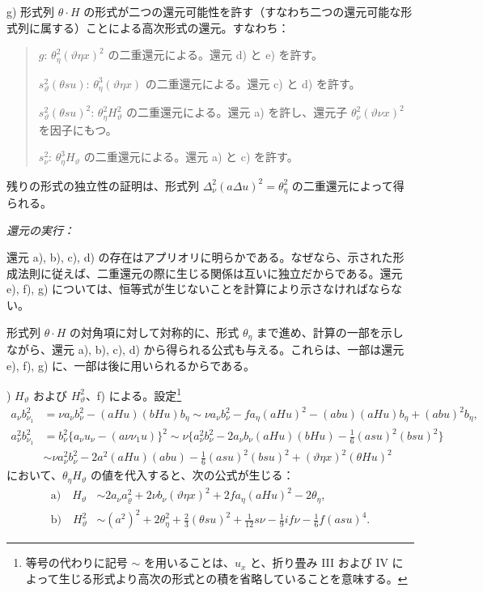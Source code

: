 \documentclass[11pt]{article}
\newcommand{\A}{\Delta}
\newcommand{\R}{\varrho}
\begin{document}
g) 形式列 $\theta\cdot H$ の形式が二つの還元可能性を許す（すなわち二つの還元可能な形式列に属する）ことによる高次形式の還元。すなわち：
\begin{quote}\small
$g$: $\theta_\eta^2(\vartheta\eta x)^2$ の二重還元による。還元 d) と e) を許す。\par
$s_\vartheta^2(\theta su)$: $\theta_\eta^3(\vartheta\eta x)$ の二重還元による。還元 c) と d) を許す。\par
$s_\vartheta^2(\theta su)^2$: $\theta_\eta^2H_\vartheta^2$ の二重還元による。還元 a) を許し、還元子 $\theta_\nu^2(\vartheta\nu x)^2$ を因子にもつ。\par
$s_\nu^2$: $\theta_\eta^3H_\vartheta$ の二重還元による。還元 a) と c) を許す。
\end{quote}
残りの形式の独立性の証明は、形式列 $\A_\nu^2(a\A u)^2=\theta_\eta^2$ の二重還元によって得られる。

\noindent\emph{還元の実行：}

還元 a), b), c), d) の存在はアプリオリに明らかである。なぜなら、示された形成法則に従えば、二重還元の際に生じる関係は互いに独立だからである。還元 e), f), g) については、恒等式が生じないことを計算により示さなければならない。

形式列 $\theta\cdot H$ の対角項に対して対称的に、形式 $\theta_\eta$ まで進め、計算の一部を示しながら、還元 a), b), c), d) から得られる公式も与える。これらは、一部は還元 e), f), g) に、一部は後に用いられるからである。

) $H_\vartheta$ および $H_\vartheta^2$、f) による。設定\footnote{等号の代わりに記号 $\sim$ を用いることは、$u_x$ と、折り畳み III および IV によって生じる形式より高次の形式との積を省略していることを意味する。}
\[
\begin{aligned}
a_\nu b_{\nu_1}^2
&=\nu a_\nu b_\nu^2-(aHu)(bHu)b_\eta
\sim \nu a_\nu b_\nu^2-f a_\eta(aHu)^2-(abu)(aHu)b_\eta+(abu)^2b_\eta,\\
a_\nu^2b_{\nu_1}^2
&=b_\nu^2\{a_\nu u_\nu-(a\nu\nu_1u)\}^2
\sim \nu\{a_\nu^2b_\nu^2-2a_\nu b_\nu(aHu)(bHu)
-\frac16(asu)^2(bsu)^2\}\\
&\sim \nu a_\nu^2b_\nu^2-2a^2(aHu)(abu)-\frac16(asu)^2(bsu)^2+(\vartheta\eta x)^2(\theta Hu)^2
\end{aligned}
\]
において、$\theta_\eta H_\vartheta$ の値を代入すると、次の公式が生じる：
\[
\tag{12}
\begin{aligned}
\text{a)}\quad H_\vartheta&\sim 2a_\nu a_\R^2+2\nu b_\nu(\vartheta\eta x)^2+2f a_\eta(aHu)^2-2\theta_\eta,\\
\text{b)}\quad H_\vartheta^2&\sim (a^2)^2+2\theta_\eta^2+\frac23(\theta su)^2
+\frac1{12}s\nu-\frac19if\nu-\frac16f(asu)^4.
\end{aligned}
\]
\end{document}

